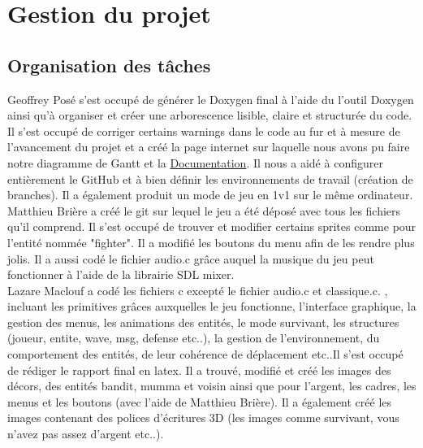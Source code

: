 \documentclass[a4paper,11pt]{article}
\begin{document}
\section{Gestion du projet}
\subsection{Organisation des tâches}

Geoffrey Posé s'est occupé de générer le Doxygen final à l'aide du l'outil Doxygen ainsi qu'à organiser et créer une arborescence lisible,
claire et structurée du code. Il s'est occupé de corriger certains warnings dans le code au fur et à mesure de l'avancement du projet et a créé la page internet sur laquelle nous avons pu faire notre diagramme de Gantt et la \href{https://mat7813.github.io/Battle-ground/doc/html/index.html}{Documentation}. Il nous a aidé à configurer entièrement le GitHub et à bien définir les environnements de travail (création de branches). 
Il a également produit un mode de jeu en 1v1 sur le même ordinateur.\\

Matthieu Brière a créé le git sur lequel le jeu a été déposé avec tous les fichiers qu'il comprend. Il s'est occupé de trouver et modifier certains sprites comme pour l'entité nommée "fighter". Il a modifié les boutons du
menu afin de les rendre plus jolis. 
Il a aussi codé le fichier audio.c grâce auquel la musique du jeu peut fonctionner à l'aide de la librairie SDL mixer.\\

Lazare Maclouf a codé les fichiers c excepté le fichier audio.c et classique.c. , incluant les primitives grâces auxquelles le jeu fonctionne,
l'interface graphique, la gestion des menus, les animations des entités, le mode survivant, les structures (joueur, entite, wave, msg, defense etc..), la gestion de l'environnement, 
du comportement des entités, de leur cohérence de déplacement etc..Il s'est occupé de rédiger le rapport final en latex.  Il a trouvé, modifié et créé les images des décors, des entités bandit, mumma et voisin ainsi que pour l'argent,
les cadres, les menus et les boutons (avec l'aide de Matthieu Brière). Il a également créé les images contenant des polices d'écritures 3D (les images comme survivant, vous n'avez pas assez d'argent etc..). \\
\end{document}
